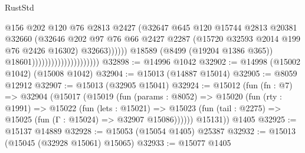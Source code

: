 \begin{lexlean}{RustStd}
\begin{coremodule}
                                                      @156
                                                      @202
                                                      @120
                                                      @76
                                                      @2813
                                                      @2427
                                                      (@32647
                                                        @645
                                                        @120
                                                        @15744
                                                        @2813
                                                        @20381
                                                        @32660
                                                        (@32646
                                                          @202
                                                          @97
                                                          @76
                                                          @66
                                                          @2427
                                                          @2287
                                                          (@15720
                                                            @32593
                                                            @2014
                                                            @199
                                                            @76
                                                            @2426
                                                            @16302)
                                                          @32663))))))
                                              @18589
                                              (@8499 (@19204 @1386 @365))
                                              @18601)))))))))))))))))))))
@32898 := @14996 @1042
@32902 := @14998 (@15002 @1042) (@15008 @1042)
@32904 := @15013 (@14887 @15014)
@32905 := @8059 @12912
@32907 := @15013 (@32905 @15041)
@32924 := @15012
    (fun (fn : @7) =>
    @32904
      (@15017
        (@15019
          (fun (params : @8052) =>
          @15020
            (fun (rty : @1991) =>
            @15022
              (fun (lets : @15021) =>
              @15023 (fun (tail : @2275) => @15025 (fun (Γ : @15024) => @32907 @15086))))))
        @15131))
    @1405
@32925 := @15137 @14889
@32928 := @15053 (@15054 @1405) @25387
@32932 := @15013 (@15045 (@32928 @15061) @15065)
@32933 := @15077 @1405

\end{coremodule}
\end{lexlean}

